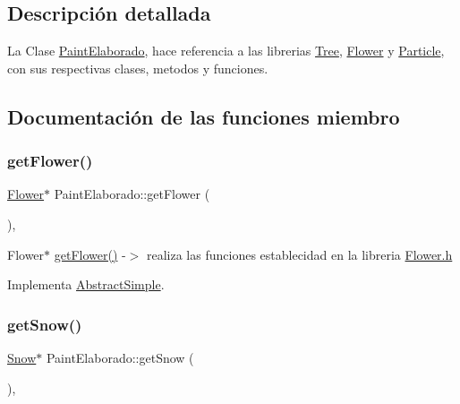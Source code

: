 \subsection{Descripción detallada}
La Clase \mbox{\hyperlink{class_paint_elaborado}{Paint\+Elaborado}}, hace referencia a las librerias \mbox{\hyperlink{class_tree}{Tree}}, \mbox{\hyperlink{class_flower}{Flower}} y \mbox{\hyperlink{class_particle}{Particle}}, con sus respectivas clases, metodos y funciones. 

\subsection{Documentación de las funciones miembro}
\mbox{\label{class_paint_elaborado_a67f3983a3aa69376424208afaadc062d}} 
\subsubsection{\texorpdfstring{getFlower()}{getFlower()}}
{\footnotesize\ttfamily \mbox{\hyperlink{class_flower}{Flower}}$\ast$ Paint\+Elaborado\+::get\+Flower (\begin{DoxyParamCaption}{ }\end{DoxyParamCaption})\hspace{0.3cm}{\ttfamily [inline]}, {\ttfamily [virtual]}}

Flower$\ast$ \mbox{\hyperlink{class_paint_elaborado_a67f3983a3aa69376424208afaadc062d}{get\+Flower()}} -\/$>$ realiza las funciones establecidad en la libreria \mbox{\hyperlink{_flower_8h}{Flower.\+h}} 

Implementa \mbox{\hyperlink{class_abstract_simple}{Abstract\+Simple}}.

\mbox{\label{class_paint_elaborado_af14e00829a13a93b28f137f7dd20474d}} 
\subsubsection{\texorpdfstring{getSnow()}{getSnow()}}
{\footnotesize\ttfamily \mbox{\hyperlink{class_snow}{Snow}}$\ast$ Paint\+Elaborado\+::get\+Snow (\begin{DoxyParamCaption}{ }\end{DoxyParamCaption})\hspace{0.3cm}{\ttfamily [inline]}, {\ttfamily [virtual]}}

